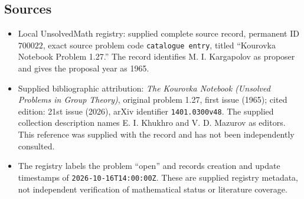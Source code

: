 \documentclass[11pt]{article}
\begin{document}
\subsection{Sources}
\begin{itemize}
\item Local UnsolvedMath registry: supplied complete source record, permanent ID \(700022\), exact source problem code \texttt{catalogue entry}, titled ``Kourovka Notebook Problem 1.27.'' The record identifies M. I. Kargapolov as proposer and gives the proposal year as 1965.
\item Supplied bibliographic attribution: \emph{The Kourovka Notebook (Unsolved Problems in Group Theory)}, original problem 1.27, first issue (1965); cited edition: 21st issue (2026), arXiv identifier \texttt{1401.0300v48}. The supplied collection description names E. I. Khukhro and V. D. Mazurov as editors. This reference was supplied with the record and has not been independently consulted.
\item The registry labels the problem ``open'' and records creation and update timestamps of \texttt{2026-10-16T14:00:00Z}. These are supplied registry metadata, not independent verification of mathematical status or literature coverage.
\end{itemize}
\end{document}
